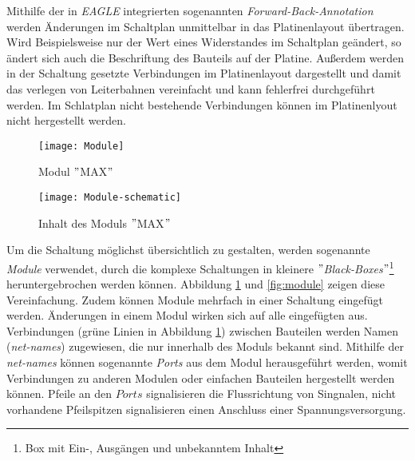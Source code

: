 Mithilfe der in \textit{EAGLE} integrierten sogenannten \textit{Forward-Back-Annotation} werden Änderungen im Schaltplan unmittelbar in das Platinenlayout übertragen. Wird Beispielsweise nur der Wert eines Widerstandes im Schaltplan geändert, so ändert sich auch die Beschriftung des Bauteils auf der Platine. Außerdem werden in der Schaltung gesetzte Verbindungen im Platinenlayout dargestellt und damit das verlegen von Leiterbahnen vereinfacht und kann fehlerfrei durchgeführt werden. Im Schlatplan nicht bestehende Verbindungen können im Platinenlyout nicht hergestellt werden.
\begin{figure}[h]
	\centering	\begin{minipage}{.35\linewidth}
		\centering
		\texttt{[image: Module]}
		\caption{Modul $"$MAX$"$}
		\label{fig:module}
	\end{minipage}
	\hfill
	\begin{minipage}{.6\linewidth}
		\centering
		\texttt{[image: Module-schematic]}
		\caption{Inhalt des Moduls $"$MAX$"$}
		\label{fig:module-schematic}
	\end{minipage}
\end{figure}
Um die Schaltung möglichst übersichtlich zu gestalten, werden sogenannte \textit{Module} verwendet, durch die komplexe Schaltungen in kleinere \textit{$"$Black-Boxes$"$}\footnote{Box mit Ein-, Ausgängen und unbekanntem Inhalt} heruntergebrochen werden können. Abbildung \ref{fig:module-schematic} und \ref{fig:module} zeigen diese Vereinfachung. Zudem können Module mehrfach in einer Schaltung eingefügt werden. Änderungen in einem Modul wirken sich auf alle eingefügten aus. Verbindungen (grüne Linien in Abbildung \ref{fig:module-schematic}) zwischen Bauteilen werden Namen (\textit{net-names}) zugewiesen, die nur innerhalb des Moduls bekannt sind. Mithilfe der \textit{net-names} können sogenannte \textit{Ports} aus dem Modul herausgeführt werden, womit Verbindungen zu anderen Modulen oder einfachen Bauteilen hergestellt werden können. Pfeile an den $Ports$ signalisieren die Flussrichtung von Singnalen, nicht vorhandene Pfeilspitzen signalisieren einen Anschluss einer Spannungsversorgung.\\